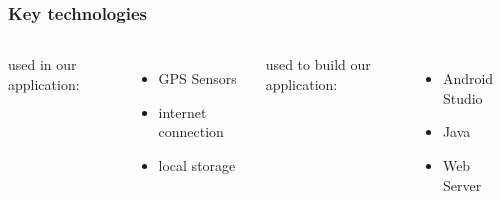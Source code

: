 \documentclass[aspectratio=169]{beamer}
\begin{document}
\begin{frame}
\frametitle{Key technologies}
	\begin{columns}
used in our application:
  \begin{itemize}
		\item GPS Sensors 
		\item internet connection
		\item local storage
  \end{itemize}
    used to build our application:
  \begin{itemize}
		\item Android Studio
		\item Java
		\item Web Server
  \end{itemize}
\end{columns}
\end{frame}
\end{document}
